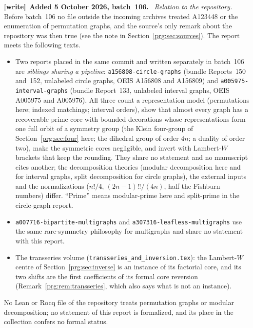 \documentclass[11pt,letterpaper]{article}
\numberwithin{equation}{section}
\theoremstyle{definition}\newtheorem{definition}[theorem]{Definition}
\theoremstyle{remark}\newtheorem{remark}[theorem]{Remark}
\newcommand{\file}[1]{\nolinkurl{#1}}
\newenvironment{writenote}[1][]{\par\smallskip\begingroup\small
 \noindent\textbf{[write]}\if\relax\detokenize{#1}\relax\else~\textbf{#1.}\fi\ }%
 {\par\endgroup\smallskip}
\begin{document}
\begin{writenote}[Added 5 October 2026, batch~106]
\emph{Relation to the repository.} Before batch~106 no file outside the
incoming archives treated A123448 or the enumeration of permutation graphs,
and the source's only remark about the repository was then true (see the
note in Section~\ref{prg:sec:sources}). The report meets the following texts.
\begin{itemize}\raggedright
\item Two reports placed in the same commit and written separately in
 batch~106 are \emph{siblings sharing a pipeline}:
 \file{a156808-circle-graphs} (bundle Reports~150 and~152, unlabeled circle
 graphs, OEIS A156808 and A156809) and \file{a005975-interval-graphs} (bundle
 Report~133, unlabeled interval graphs, OEIS A005975 and A005976). All three
 count a representation model (permutations here; indexed matchings; interval
 orders), show that almost every graph has a recoverable prime core with
 bounded decorations whose representations form one full orbit of a symmetry
 group (the Klein four-group of Section~\ref{prg:sec:four} here; the
 dihedral group of order $4n$; a duality of order two), make the symmetric
 cores negligible, and invert with Lambert-$W$ brackets that keep the
 rounding. They share no statement and no manuscript cites another; the
 decomposition theories (modular decomposition here and for interval graphs,
 split decomposition for circle graphs), the external inputs and the
 normalizations ($n!/4$, $(2n-1)!!/(4n)$, half the Fishburn numbers) differ.
 ``Prime'' means modular-prime here and split-prime in the circle-graph
 report.
\item \file{a007716-bipartite-multigraphs} and
 \file{a307316-leafless-multigraphs} use the same rare-symmetry philosophy for
 multigraphs and share no statement with this report.
\item The transseries volume
 (\file{transseries_and_inversion.tex}): the Lambert-$W$ centre of
 Section~\ref{prg:sec:inverse} is an instance of its factorial core, and its
 two shifts are the first coefficients of its formal core reversion
 (Remark~\ref{prg:rem:transseries}, which also says what is not an instance).
\end{itemize}
No Lean or Rocq file of the repository treats permutation graphs or modular
decomposition; no statement of this report is formalized, and its place in
the collection confers no formal status.
\end{writenote}
\end{document}
